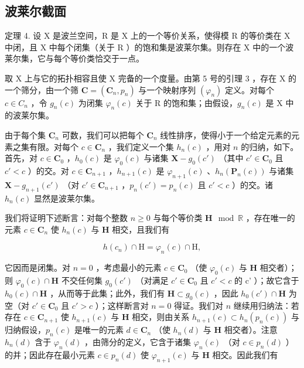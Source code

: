 \subsection{波莱尔截面}

定理 4. 设 X 是波兰空间，R 是 X 上的一个等价关系，使得模 R 的等价类在 X 中闭，且 X 中每个闭集（关于 R ）的饱和集是波莱尔集。则存在 X 中的一个波莱尔集，它与每个等价类恰交于一点。

取 X 上与它的拓扑相容且使 X 完备的一个度量。由第 5 号的引理 3 ，存在 X 的一个筛分，由一个筛 \(\mathbf{C} = (\mathbf{C}_{n}, p_{n})\) 与一个映射序列 \((\varphi_{n})\) 定义。对每个 \(c \in C_{n}\) ，令 \(g_{n}(c)\) 为闭集 \(\varphi_{n}(c)\) 关于 R 的饱和集；由假设，\(g_{n}(c)\) 是 X 中的波莱尔集。

由于每个集 \(\mathbf{C}_n\) 可数，我们可以把每个 \(\mathbf{C}_n\) 线性排序，使得小于一个给定元素的元素之集有限。对每个 \(c \in \mathbf{C}_n\) ，我们定义一个集 \(h_n(c)\) ，用对 \(n\) 的归纳，如下。首先，对 \(c \in \mathbf{C}_0\) ，\(h_0(c)\) 是 \(\varphi_0(c)\) 与诸集 \(\mathbf{X} - g_0(c')\) （其中 \(c' \in \mathbf{C}_0\) 且 \(c' < c\) ）的交。对 \(c \in \mathbf{C}_{n+1}\) ，\(h_{n+1}(c)\) 是 \(\varphi_{n+1}(c)\) 、\(h_n(\mathbf{P}_n(c))\) 与诸集 \(\mathbf{X} - g_{n+1}(c')\) （对 \(c' \in \mathbf{C}_{n+1}\) ，\(p_n(c') = p_n(c)\) 且 \(c' < c\) ）的交。诸 \(h_n(c)\) 显然是波莱尔集。

我们将证明下述断言：对每个整数 \(n \geqslant 0\) 与每个等价类 \(\mathbf{H} \mod \mathbb{R}\) ，存在唯一的元素 \(c \in \mathbf{C}_n\) 使 \(h_n(c)\) 与 \(\mathbf{H}\) 相交，且我们有

\[
h (c _ {n}) \cap \mathrm{H} = \varphi_ {n} (c) \cap \mathrm{H},
\]

它因而是闭集。对 \(n = 0\) ，考虑最小的元素 \(c \in \mathbf{C}_0\) （使 \(\varphi_0(c)\) 与 \(\mathbf{H}\) 相交者）；则 \(\varphi_0(c) \cap \mathbf{H}\) 不交任何集 \(g_0(c')\) （对满足 \(c' \in \mathbf{C}_0\) 且 \(c' < c\) 的 c' ）；故它含于 \(h_0(c) \cap \mathbf{H}\) ，从而等于此集；此外，我们有 \(\mathbf{H} \subset g_0(c)\) ，因此 \(h_0(c') \cap \mathbf{H}\) 为空（对 \(c' \in \mathbf{C}_0\) 且 \(c' > c\) ）；这样断言对 \(n = 0\) 得证。我们对 \(n\) 继续用归纳法：若存在 \(c \in \mathbf{C}_{n+1}\) 使 \(h_{n+1}(c)\) 与 \(\mathbf{H}\) 相交，则由关系 \(h_{n+1}(c) \subset h_n(p_n(c))\) 与归纳假设，\(p_n(c)\) 是唯一的元素 \(d \in \mathbf{C}_n\) （使 \(h_n(d)\) 与 \(\mathbf{H}\) 相交者）。注意 \(h_n(d)\) 含于 \(\varphi_n(d)\) ，由筛分的定义，它含于诸集 \(\varphi_n(c)\) （对 \(c \in p_n(d)\) ）的并；因此存在最小元素 \(c \in p_n(d)\) 使 \(\varphi_{n+1}(c)\) 与 \(\mathbf{H}\) 相交。因此我们有

